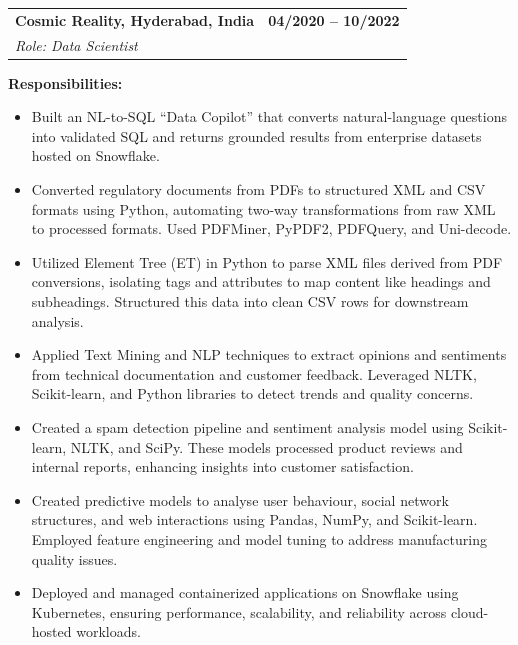 \noindent
\begin{tabularx}{\linewidth}{@{}X r@{}}
  \textbf{Cosmic Reality, Hyderabad, India} & \textbf{04/2020 -- 10/2022}\\
  \textit{Role: Data Scientist} &
\end{tabularx}

\textbf{Responsibilities:}
\begin{itemize}
  \item Built an NL-to-SQL ``Data Copilot'' that converts natural-language questions into validated
        SQL and returns grounded results from enterprise datasets hosted on Snowflake.

  \item Converted regulatory documents from PDFs to structured XML and CSV formats using Python,
        automating two-way transformations from raw XML to processed formats. Used PDFMiner,
        PyPDF2, PDFQuery, and Uni-decode.

  \item Utilized Element Tree (ET) in Python to parse XML files derived from PDF conversions,
        isolating tags and attributes to map content like headings and subheadings. Structured this
        data into clean CSV rows for downstream analysis.

  \item Applied Text Mining and NLP techniques to extract opinions and sentiments from technical
        documentation and customer feedback. Leveraged NLTK, Scikit-learn, and Python libraries
        to detect trends and quality concerns.

  \item Created a spam detection pipeline and sentiment analysis model using Scikit-learn, NLTK,
        and SciPy. These models processed product reviews and internal reports, enhancing insights
        into customer satisfaction.

  \item Created predictive models to analyse user behaviour, social network structures, and web
        interactions using Pandas, NumPy, and Scikit-learn. Employed feature engineering and model
        tuning to address manufacturing quality issues.

  \item Deployed and managed containerized applications on Snowflake using Kubernetes, ensuring
        performance, scalability, and reliability across cloud-hosted workloads.


\end{itemize}
